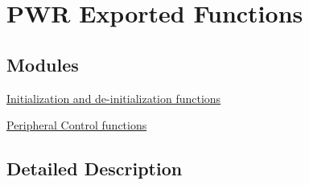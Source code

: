 \hypertarget{group___p_w_r___exported___functions}{}\section{P\+WR Exported Functions}
\label{group___p_w_r___exported___functions}
\subsection*{Modules}
\begin{DoxyCompactItemize}
\item 
\hyperlink{group___p_w_r___exported___functions___group1}{Initialization and de-\/initialization functions}
\item 
\hyperlink{group___p_w_r___exported___functions___group2}{Peripheral Control functions}
\end{DoxyCompactItemize}


\subsection{Detailed Description}
